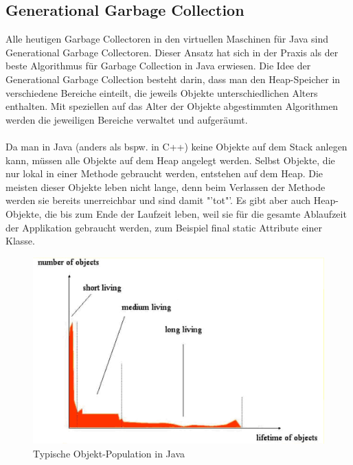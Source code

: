 \documentclass[a4paper,14pt]{scrreprt}
\begin{document}
\subsection{Generational Garbage Collection}
Alle heutigen Garbage Collectoren in den virtuellen Maschinen für Java sind Generational Garbage Collectoren. Dieser Ansatz hat sich in der Praxis als der beste Algorithmus für Garbage Collection in Java erwiesen. Die Idee der Generational Garbage Collection besteht darin, dass man den Heap-Speicher in verschiedene Bereiche einteilt, die jeweils Objekte unterschiedlichen Alters enthalten. Mit speziellen auf das Alter der Objekte abgestimmten Algorithmen werden die jeweiligen Bereiche verwaltet und aufgeräumt.\\\\Da man in Java (anders als bspw. in C++) keine Objekte auf dem Stack anlegen kann, müssen alle Objekte auf dem Heap angelegt werden. Selbst Objekte, die nur lokal in einer Methode gebraucht werden, entstehen auf dem Heap. Die meisten dieser Objekte leben nicht lange, denn beim Verlassen der Methode werden sie bereits unerreichbar und sind damit "'tot"'.  Es gibt aber auch Heap-Objekte, die bis zum Ende der Laufzeit leben, weil sie für die gesamte Ablaufzeit der Applikation gebraucht werden, zum Beispiel final static Attribute einer Klasse.
\begin{figure}[h!]
\centering
\includegraphics[width=0.8\linewidth]{./imageG8T}
\caption[Typische Objekt-Population in Java]{Typische Objekt-Population in Java}
\label{fig:imageG8T}
\end{figure}
\end{document}

